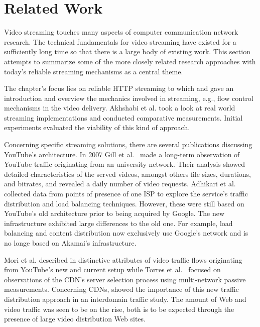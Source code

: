 \section{Related Work}

Video streaming touches many aspects of computer communication network research. The technical fundamentals for video streaming have existed for a sufficiently long time so that there is a large body of existing work. This section attempts to summarize some of the more closely related research approaches with today's reliable streaming mechanisms as a central theme.

The chapter's focus lies on reliable \gls{HTTP} streaming to which \cite{watching-video1,watching-video2} and \cite{ma2011mobile} gave an introduction and overview the mechanics involved in streaming, e.g., flow control mechanisms in the video delivery. Akhshabi et al. \cite{akhshabi2011experimental} took a look at real world streaming implementations and conducted comparative measurements. Initial experiments evaluated the viability of this kind of approach. 

Concerning specific streaming solutions, there are several publications discussing YouTube's architecture. In 2007 Gill et al.~\cite{gill2007youtube} made a long-term observation of YouTube traffic originating from an university network. Their analysis showed detailed characteristics of the served videos, amongst others file sizes, durations, and bitrates, and revealed a daily number of video requests. Adhikari et al.~\cite{adhikari2010youtube} collected data from points of presence of one \gls{ISP} to explore the service's traffic distribution and load balancing techniques. However, these were still based on YouTube's old architecture prior to being acquired by Google. The new infrastructure exhibited large differences to the old one. For example, load balancing and content distribution now exclusively use Google's network and is no longe based on Akamai's infrastructure. 

Mori et al. described in \cite{mori2010characterizing} distinctive attributes of video traffic flows originating from YouTube's new and current setup while Torres et al.~\cite{torres2011dissecting} focused on observations of the \gls{CDN}'s server selection process using multi-network passive measurements. Concerning \glspl{CDN}, \cite{Labovitz:2010:IIT:2043164.1851194} showed the importance of this new traffic distribution approach in an interdomain traffic study. The amount of Web and video traffic was seen to be on the rise, both is to be expected through the presence of large video distribution Web sites.


